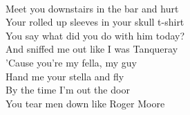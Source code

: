 \\
Meet you downstairs in the bar and hurt \\
Your rolled up sleeves in your skull t-shirt \\
You say what did you do with him today? \\
And sniffed me out like I was Tanqueray \\
'Cause you're my fella, my guy \\
Hand me your stella and fly \\
By the time I'm out the door \\
You tear men down like Roger Moore \\
